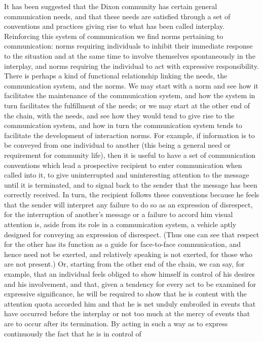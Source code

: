 \documentclass[openany,nobib]{tufte-book}
\begin{document}
It has been suggested that the Dixon community has certain general
communication needs, and that these needs are satisfied through a set of
conventions and practices giving rise to what has been called interplay.
Reinforcing this system of communication we find norms pertaining to
communication: norms requiring individuals to inhibit their immediate
response to the situation and at the same time to involve themselves
spontaneously in the interplay, and norms requiring the individual to
act with expressive responsibility. There is perhaps a kind of
functional relationship linking the needs, the communication system, and
the norms. We may start with a norm and see how it facilitates the
maintenance of the communication system, and how the system in turn
facilitates the fulfillment of the needs; or we may start at the other
end of the chain, with the needs, and see how they would tend to give
rise to the communication system, and how in turn the communication
system tends to facilitate the development of interaction norms. For
example, if information is to be conveyed from one individual to another
(this being a general need or requirement for community life), then it
is useful to have a set of communication conventions which lead a
prospective recipient to enter communication when called into it, to
give uninterrupted and uninteresting attention to the message until it
is terminated, and to signal back to the sender that the message has
been correctly received. In turn, the recipient follows these
conventions because he feels that the sender will interpret any failure
to do so as an expression of disrespect, for the interruption of
another's message or a failure to accord him visual attention is, aside
from its role in a communication system, a vehicle aptly designed for
conveying an expression of disrespect. (Thus one can see that respect
for the other has its function as a guide for face-to-face
communication, and hence need not be exerted, and relatively speaking is
not exerted, for those who are not present.) Or, starting from the other
end of the chain, we can say, for example, that an individual feels
obliged to show himself in control of his desires and his involvement,
and that, given a tendency for every act to be examined for expressive
significance, he will be required to show that he is content with the
attention quota accorded him and that he is net unduly embroiled in
events that have occurred before the interplay or not too much at the
mercy of events that are to occur after its termination. By acting in
such a way as to express continuously the fact that he is in control of
\end{document}
